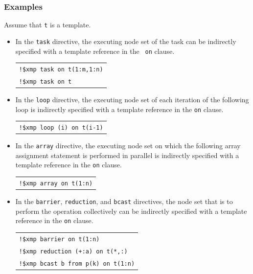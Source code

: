 
\subsubsection*{Examples}

Assume that {\tt t} is a template.

\begin{itemize}
\item In the {\tt task} directive, the executing node set of the task
      can be indirectly specified with a template reference in the {\tt
      on} clause.

\begin{tabular}{l}
\verb|!$xmp task on t(1:m,1:n)| \\
\verb|!$xmp task on t| \\
\end{tabular}

\item In the {\tt loop} directive, the executing node set of each
      iteration of the following loop is indirectly specified with a
      template reference in the {\tt on} clause.

\begin{tabular}{l}
\verb|!$xmp loop (i) on t(i-1)| \\
\end{tabular}%

\item In the {\tt array} directive, the executing node set on which the
      following array assignment statement is performed in parallel is
      indirectly specified with a template reference in the {\tt on}
      clause.

\begin{tabular}{l}
\verb|!$xmp array on t(1:n)| \\
\end{tabular}%

\item In the {\tt barrier}, {\tt reduction}, and {\tt bcast} directives,
      the node set that is to perform the operation collectively can be
      indirectly specified with a template reference in the {\tt on}
      clause.

\begin{tabular}{l}
\verb|!$xmp barrier on t(1:n)| \\
\verb|!$xmp reduction (+:a) on t(*,:)| \\
\verb|!$xmp bcast b from p(k) on t(1:n)| \\
\end{tabular}

\end{itemize}


